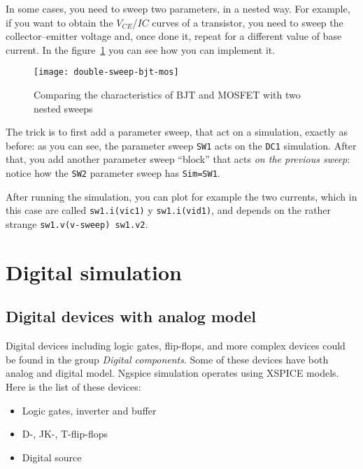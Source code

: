 In some cases, you need to sweep two parameters, in a nested way. For example, if you want to obtain the $V_{CE}$/$I{C}$ curves of a transistor, you need to sweep the collector--emitter  voltage and, once done it, repeat for a different value of base current. In the figure~\ref{fig:double-sweep-bjt-mos} you can see how you can implement it.

\begin{figure}[!ht]
    \begin{center}
        \texttt{[image: double-sweep-bjt-mos]}
    \end{center}
    \caption{Comparing the characteristics of BJT and MOSFET with two nested sweeps}
    \label{fig:double-sweep-bjt-mos}
\end{figure}

The trick is to first add a parameter sweep, that act on a simulation, exactly as before:
as you can see, the parameter sweep \texttt{SW1} acts on the \texttt{DC1} simulation. After that, you add another parameter sweep ``block'' that acts \emph{on the previous sweep}: notice how the \texttt{SW2} parameter sweep has \texttt{Sim=SW1}.

After running the simulation, you can plot for example the two currents, which in this case are called \texttt{sw1.i(vic1)} y \texttt{sw1.i(vid1)}, and depends on the rather strange \texttt{sw1.v(v-sweep) sw1.v2}.

\section{Digital simulation}

\subsection{Digital devices with analog model}

Digital devices including logic gates, flip-flops, and more complex devices could be found in the group \emph{Digital components}. Some of these devices have both analog and digital model. Ngspice simulation operates using XSPICE models. Here is the list of these devices:

\begin{itemize}
 \item Logic gates, inverter and buffer
 \item D-, JK-, T-flip-flops
 \item Digital source
\end{itemize}

